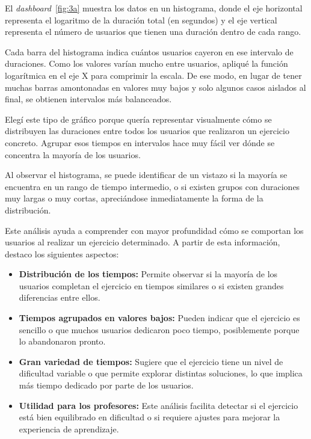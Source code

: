 \documentclass[a4paper, 12pt]{book}
\begin{document}
El \textit{dashboard}~\ref{fig:3a} muestra los datos en un histograma, donde el eje horizontal representa el logaritmo de la duración total (en segundos) y el eje vertical representa el número de usuarios que tienen una duración dentro de cada rango.

Cada barra del histograma indica cuántos usuarios cayeron en ese intervalo de duraciones. Como los valores varían mucho entre usuarios, apliqué la función logarítmica en el eje X para comprimir la escala. De ese modo, en lugar de tener muchas barras amontonadas en valores muy bajos y solo algunos casos aislados al final, se obtienen intervalos más balanceados.

Elegí este tipo de gráfico porque quería representar visualmente cómo se distribuyen las duraciones entre todos los usuarios que realizaron un ejercicio concreto. Agrupar esos tiempos en intervalos hace muy fácil ver dónde se concentra la mayoría de los usuarios.

Al observar el histograma, se puede identificar de un vistazo si la mayoría se encuentra en un rango de tiempo intermedio, o si existen grupos con duraciones muy largas o muy cortas, apreciándose inmediatamente la forma de la distribución.

Este análisis ayuda a comprender con mayor profundidad cómo se comportan los usuarios al realizar un ejercicio determinado. A partir de esta información, destaco los siguientes aspectos:

\begin{itemize}
  \item \textbf{Distribución de los tiempos:} Permite observar si la mayoría de los usuarios completan el ejercicio en tiempos similares o si existen grandes diferencias entre ellos.

  \item \textbf{Tiempos agrupados en valores bajos:} Pueden indicar que el ejercicio es sencillo o que muchos usuarios dedicaron poco tiempo, posiblemente porque lo abandonaron pronto.

  \item \textbf{Gran variedad de tiempos:} Sugiere que el ejercicio tiene un nivel de dificultad variable o que permite explorar distintas soluciones, lo que implica más tiempo dedicado por parte de los usuarios.

  \item \textbf{Utilidad para los profesores:} Este análisis facilita detectar si el ejercicio está bien equilibrado en dificultad o si requiere ajustes para mejorar la experiencia de aprendizaje.
\end{itemize}
\end{document}
